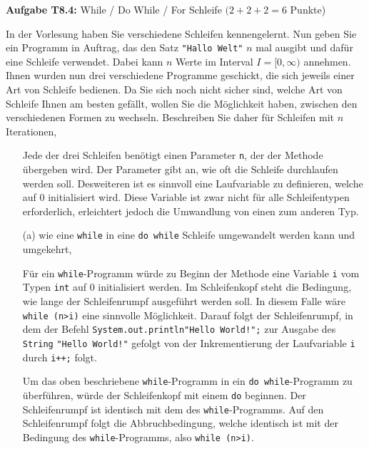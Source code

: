 \newpage

\textbf{Aufgabe T8.4:} While / Do While / For Schleife $(2+2+2=6$ Punkte) 

In der Vorlesung haben Sie verschiedene Schleifen kennengelernt. Nun geben Sie ein Programm in Auftrag, das den Satz \texttt{"Hallo Welt"} $n$ mal ausgibt und dafür eine Schleife verwendet. Dabei kann $n$ Werte im Interval $I=[0, \infty)$ annehmen. Ihnen wurden nun drei verschiedene Programme geschickt, die sich jeweils einer Art von Schleife bedienen. Da Sie sich noch nicht sicher sind, welche Art von Schleife Ihnen am besten gefällt, wollen Sie die Möglichkeit haben, zwischen den verschiedenen Formen zu wechseln. Beschreiben Sie daher für Schleifen mit $n$ Iterationen,

\begin{itemize}

  \item [] Jede der drei Schleifen benötigt einen Parameter \texttt{n}, der der Methode 
  übergeben wird. Der Parameter gibt an, wie oft die Schleife durchlaufen werden 
  soll. Desweiteren ist es sinnvoll eine Laufvariable zu definieren, welche auf 0
  initialisiert wird. Diese Variable ist zwar nicht für alle Schleifentypen 
  erforderlich, erleichtert jedoch die Umwandlung von einen zum anderen Typ.

  \item [(a)] wie eine \texttt{while} in eine \texttt{do while} Schleife umgewandelt werden kann und umgekehrt,

  Für ein \texttt{while}-Programm würde zu Beginn der Methode eine 
  Variable \texttt{i} vom Typen \texttt{int} auf 0 initialisiert werden. Im Schleifenkopf steht die
  Bedingung, wie lange der Schleifenrumpf ausgeführt werden soll. In diesem Falle 
  wäre \texttt{while (n>i)} eine sinnvolle Möglichkeit. Darauf folgt der
  Schleifenrumpf, in dem der Befehl \texttt{System.out.println"Hello World!";} zur Ausgabe des 
  \texttt{String} \texttt{"Hello World!"} gefolgt 
  von der Inkrementierung der Laufvariable \texttt{i} durch \texttt{i++;} folgt.

  Um das oben beschriebene \texttt{while}-Programm in ein \texttt{do while}-Programm zu
  überführen, würde der Schleifenkopf mit einem \texttt{do} beginnen. Der Schleifenrumpf ist
  identisch mit dem des \texttt{while}-Programms. Auf den Schleifenrumpf folgt die
  Abbruchbedingung, welche identisch ist mit der Bedingung des \texttt{while}-Programms,
  also \texttt{while (n>i)}.


\end{itemize}
